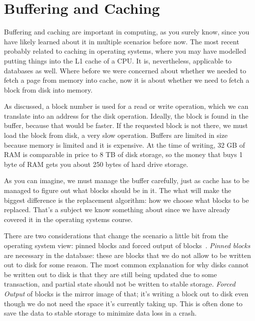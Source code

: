 




\section*{Buffering and Caching}

Buffering and caching are important in computing, as you surely know, since you have likely learned about it in multiple scenarios before now. The most recent probably related to caching in operating systems, where you may have modelled putting things into the L1 cache of a CPU. It is, nevertheless, applicable to databases as well. Where before we were concerned about whether we needed to fetch a page from memory into cache, now it is about whether we need to fetch a block from disk into memory.

As discussed, a block number is used for a read or write operation, which we can translate into an address for the disk operation. Ideally, the block is found in the buffer, because that would be faster. If the requested block is not there, we must load the block from disk, a very slow operation. Buffers are limited in size because memory is limited and it is expensive. At the time of writing, 32 GB of RAM is comparable in price to 8 TB of disk storage, so the money that buys 1 byte of RAM gets you about 250 bytes of hard drive storage.

As you can imagine, we must manage the buffer carefully, just as cache has to be managed to figure out what blocks should be in it. The what will make the biggest difference is the replacement algorithm: how we choose what blocks to be replaced. That's a subject we know something about since we have already covered it in the operating systems course.

There are two considerations that change the scenario a little bit from the operating system view: pinned blocks and forced output of blocks~\cite{dsc}. \textit{Pinned blocks} are necessary in the database: these are blocks that we do not allow to be written out to disk for some reason. The most common explanation for why disks cannot be written out to disk is that they are still being updated due to some transaction, and partial state should not be written to stable storage. \textit{Forced Output} of blocks is the mirror image of that; it's writing a block out to disk even though we do not need the space it's currently taking up. This is often done to save the data to stable storage to minimize data loss in a crash.


